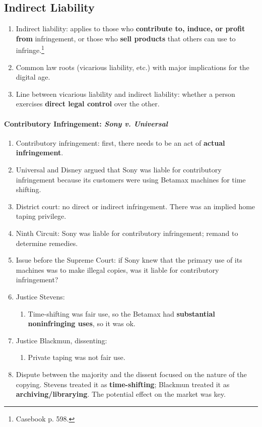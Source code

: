 \subsection{Indirect Liability}

\begin{enumerate}
    \item Indirect liability: applies to those who \textbf{contribute to, 
    induce, or profit from} infringement, or those who \textbf{sell products} 
    that others can use to infringe.\footnote{Casebook p. 598.}
    \item Common law roots (vicarious liability, etc.) with major implications 
    for the digital age.
    \item Line between vicarious liability and indirect liability: whether a 
    person exercises \textbf{direct legal control} over the other.
\end{enumerate}

\paragraph{Contributory Infringement: \emph{Sony v. Universal}}

\begin{enumerate}
    \item Contributory infringement: first, there needs to be an act of 
    \textbf{actual infringement}.
    \item Universal and Disney argued that Sony was liable for contributory 
    infringement because its customers were using Betamax machines for time 
    shifting.
    \item District court: no direct or indirect infringement. There was an 
    implied home taping privilege.
    \item Ninth Circuit: Sony was liable for contributory infringement; remand 
    to determine remedies.
    \item Issue before the Supreme Court: if Sony knew that the primary use of 
    its machines was to make illegal copies, was it liable for contributory 
    infringement?
    \item Justice Stevens:
    \begin{enumerate}
        \item Time-shifting was fair use, so the Betamax had 
        \textbf{substantial noninfringing uses}, so it was ok.
    \end{enumerate}
    \item Justice Blackmun, dissenting: 
    \begin{enumerate}
        \item Private taping was not fair use.
    \end{enumerate}
    \item Dispute between the majority and the dissent focused on the nature 
    of the copying. Stevens treated it as \textbf{time-shifting}; Blackmun 
    treated it as \textbf{archiving/librarying}. The potential effect on the 
    market was key.
\end{enumerate}


